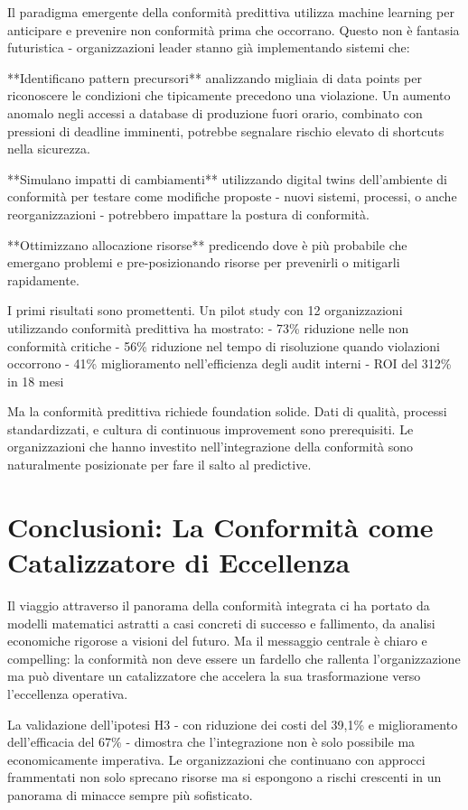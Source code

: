 Il paradigma emergente della conformità predittiva utilizza machine learning per anticipare e prevenire non conformità prima che occorrano. Questo non è fantasia futuristica - organizzazioni leader stanno già implementando sistemi che:

**Identificano pattern precursori** analizzando migliaia di data points per riconoscere le condizioni che tipicamente precedono una violazione. Un aumento anomalo negli accessi a database di produzione fuori orario, combinato con pressioni di deadline imminenti, potrebbe segnalare rischio elevato di shortcuts nella sicurezza.

**Simulano impatti di cambiamenti** utilizzando digital twins dell'ambiente di conformità per testare come modifiche proposte - nuovi sistemi, processi, o anche reorganizzazioni - potrebbero impattare la postura di conformità.

**Ottimizzano allocazione risorse** predicendo dove è più probabile che emergano problemi e pre-posizionando risorse per prevenirli o mitigarli rapidamente.

I primi risultati sono promettenti. Un pilot study con 12 organizzazioni utilizzando conformità predittiva ha mostrato:
- 73\% riduzione nelle non conformità critiche
- 56\% riduzione nel tempo di risoluzione quando violazioni occorrono
- 41\% miglioramento nell'efficienza degli audit interni
- ROI del 312\% in 18 mesi

Ma la conformità predittiva richiede foundation solide. Dati di qualità, processi standardizzati, e cultura di continuous improvement sono prerequisiti. Le organizzazioni che hanno investito nell'integrazione della conformità sono naturalmente posizionate per fare il salto al predictive.

\section{Conclusioni: La Conformità come Catalizzatore di Eccellenza}

Il viaggio attraverso il panorama della conformità integrata ci ha portato da modelli matematici astratti a casi concreti di successo e fallimento, da analisi economiche rigorose a visioni del futuro. Ma il messaggio centrale è chiaro e compelling: la conformità non deve essere un fardello che rallenta l'organizzazione ma può diventare un catalizzatore che accelera la sua trasformazione verso l'eccellenza operativa.

La validazione dell'ipotesi H3 - con riduzione dei costi del 39,1\% e miglioramento dell'efficacia del 67\% - dimostra che l'integrazione non è solo possibile ma economicamente imperativa. Le organizzazioni che continuano con approcci frammentati non solo sprecano risorse ma si espongono a rischi crescenti in un panorama di minacce sempre più sofisticato.

